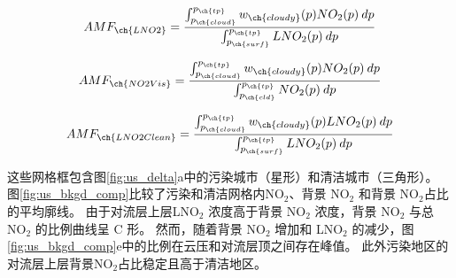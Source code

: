 \begin{equation} \label{AMFLNO2_crf100}
AMF_{\ch{LNO2}} = \frac{\int_{p_{\ch{cloud}}}^{p_{\ch{tp}}} w_{\ch{cloudy}}(p) NO_2(p) \: dp}{\int_{p_{\ch{surf}}}^{p_{\ch{tp}}} LNO_2(p) \: dp}
\end{equation}

\begin{equation} \label{AMFNO2Vis_crf100}
AMF_{\ch{NO2Vis}} = \frac{\int_{p_{\ch{cloud}}}^{p_{\ch{tp}}} w_{\ch{cloudy}}(p) NO_2(p) \: dp}{\int_{p_{\ch{cld}}}^{p_{\ch{tp}}} NO_2(p) \: dp}
\end{equation}

\begin{equation} \label{AMFLNO2Clean_crf100}
AMF_{\ch{LNO2Clean}} = \frac{\int_{p_{\ch{cloud}}}^{p_{\ch{tp}}} w_{\ch{cloudy}}(p) LNO_2(p) \: dp}{\int_{p_{\ch{surf}}}^{p_{\ch{tp}}} LNO_2(p) \: dp}
\end{equation}

这些网格框包含图\ref{fig:us_delta}a中的污染城市（星形）和清洁城市（三角形）。
图\ref{fig:us_bkgd_comp}比较了污染和清洁网格内NO$_2$、背景 NO$_2$ 和背景 NO$_2$占比的平均廓线。
由于对流层上层LNO$_2$ 浓度高于背景 NO$_2$ 浓度，背景 NO$_2$ 与总 NO$_2$ 的比例曲线呈 C 形。
然而，随着背景 NO$_2$ 增加和 LNO$_2$ 的减少，图\ref{fig:us_bkgd_comp}e中的比例在云压和对流层顶之间存在峰值。
此外污染地区的对流层上层背景NO$_2$占比稳定且高于清洁地区。

